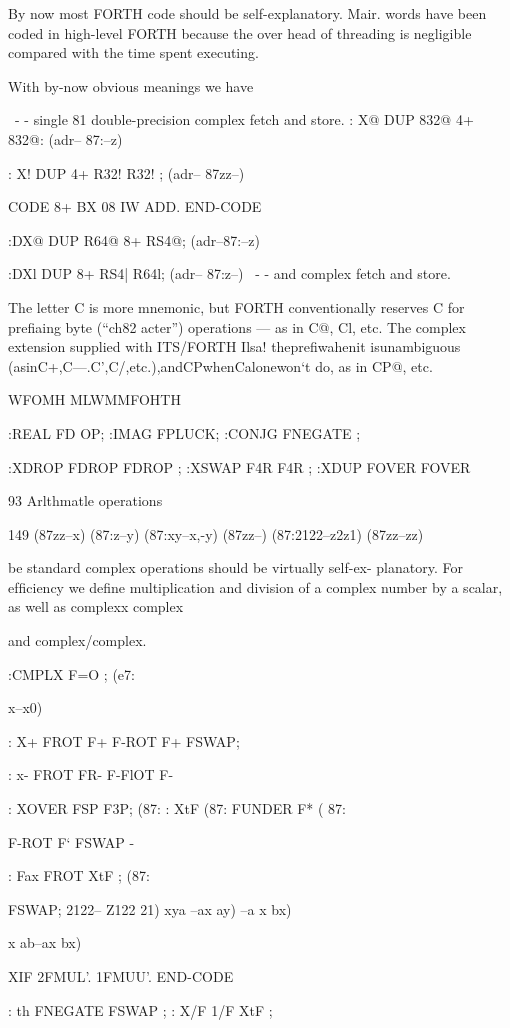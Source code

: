 {By now most FORTH code should be self-explanatory. Mair.
words have been coded in high-level FORTH because the over
head of threading is negligible compared with the time spent
executing.

With by-now obvious meanings we have

\ - - single 81 double-precision complex fetch and store.
: X@ DUP 832@ 4+ 832@: (adr-- 87:--z)

: X! DUP 4+ R32! R32! ; (adr-- 87zz--)

CODE 8+ BX 08 IW ADD. END-CODE

:DX@ DUP R64@ 8+ RS4@; (adr--87:--z)

:DXl DUP 8+ RS4| R64l; (adr-- 87:z--)
\ - - and complex fetch and store.

 

The letter C is more mnemonic, but FORTH conventionally reserves C for preﬁaing byte (“ch82
acter”) operations — as in C@, Cl, etc. The complex extension supplied with ITS/FORTH Ilsa!
thepreﬁwahenit isunambiguous (asinC+,C—.C',C/,etc.),andCPwhenCalonewon‘t
do, as in CP@, etc.

WFOMH MLWMMFOHTH

\Madt

:REAL FD OP;
:IMAG FPLUCK;
:CONJG FNEGATE ;

:XDROP FDROP FDROP ;
:XSWAP F4R F4R ;
:XDUP FOVER FOVER

93 Arlthmatle operations

149
(87zz--x)
(87:z--y)
(87:xy--x,-y)
(87zz--)
(87:2122--z2z1)
(87zz--zz)

be standard complex operations should be virtually self-ex-
planatory. For efﬁciency we deﬁne multiplication and division
of a complex number by a scalar, as well as complexx complex

and complex/complex.

:CMPLX F=O ; (e7:

x--x0)

: X+ FROT F+ F-ROT F+ FSWAP;

: x- FROT FR- F-FlOT F-

: XOVER FSP F3P; (87:
: XtF (87:
FUNDER F* ( 87:

F-ROT F‘ FSWAP -

: Fax FROT XtF ; (87:

FSWAP;
2122-- Z122 21)
xya --ax ay)
--a x bx)

x ab--ax bx)

\CODE XIF 2FMUL'. 1FMUU’. END-CODE

: th FNEGATE FSWAP ;
: X/F 1/F XtF ;

}
